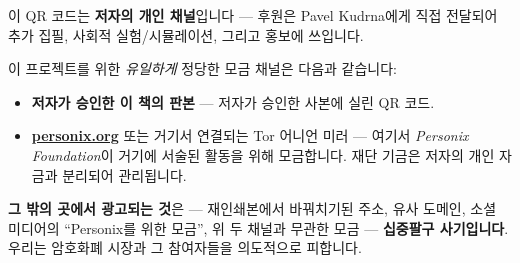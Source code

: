 \begin{minipage}[t]{0.60\textwidth}
\vspace{0pt}
\begin{mdframed}[
  linewidth=0.7pt,roundcorner=5pt,
  innerleftmargin=10pt,innerrightmargin=10pt,
  innertopmargin=8pt,innerbottommargin=8pt,
  skipabove=0pt,skipbelow=0pt,
  linecolor=cbwarning!50,backgroundcolor=cbwarning!5,
  nobreak=true,
  needspace=4\baselineskip,
]
\footnotesize
이 QR 코드는 \textbf{저자의 개인 채널}입니다 --- 후원은 Pavel Kudrna에게 직접 전달되어 추가 집필, 사회적 실험/시뮬레이션, 그리고 홍보에 쓰입니다.

\smallskip
이 프로젝트를 위한 \emph{유일하게} 정당한 모금 채널은 다음과 같습니다:

\smallskip
\begin{itemize}
\setlength{\itemsep}{0pt}
\setlength{\topsep}{0pt}
\item \textbf{저자가 승인한 이 책의 판본} --- 저자가 승인한 사본에 실린 QR 코드.
\item \href{https://personix.org}{\textbf{personix.org}} 또는 거기서 연결되는 Tor 어니언 미러 --- 여기서 \emph{Personix Foundation}이 거기에 서술된 활동을 위해 모금합니다. 재단 기금은 저자의 개인 자금과 분리되어 관리됩니다.
\end{itemize}

\smallskip
\textbf{그 밖의 곳에서 광고되는 것}은 --- 재인쇄본에서 바꿔치기된 주소, 유사 도메인, 소셜 미디어의 ``Personix를 위한 모금'', 위 두 채널과 무관한 모금 --- \textbf{십중팔구 사기입니다}. 우리는 암호화폐 시장과 그 참여자들을 의도적으로 피합니다.
\end{mdframed}
\end{minipage}

\clearpage
